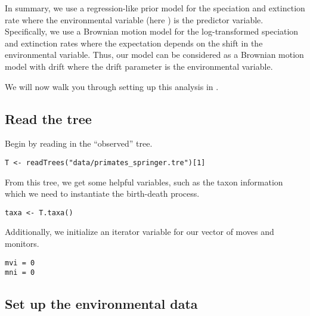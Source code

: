 In summary, we use a regression-like prior model for the speciation and extinction rate where the environmental variable (here \COO) is the predictor variable.
Specifically, we use a Brownian motion model for the log-transformed speciation and extinction rates where the expectation depends on the shift in the environmental variable.
Thus, our model can be considered as a Brownian motion model with drift where the drift parameter is the environmental variable.

We will now walk you through setting up this analysis in \RevBayes.

\subsection{Read the tree}

Begin by reading in the ``observed'' tree. 
{\tt \begin{snugshade*}
\begin{lstlisting}
T <- readTrees("data/primates_springer.tre")[1]
\end{lstlisting}
\end{snugshade*}}

From this tree, we get some helpful variables, such as the taxon information which we need to instantiate the birth-death process.
{\tt \begin{snugshade*}
\begin{lstlisting}
taxa <- T.taxa()
\end{lstlisting}
\end{snugshade*}}

Additionally, we initialize an iterator variable for our vector of moves and monitors.
{\tt \begin{snugshade*}
\begin{lstlisting}
mvi = 0
mni = 0
\end{lstlisting}
\end{snugshade*}}



\subsection{Set up the environmental data}

